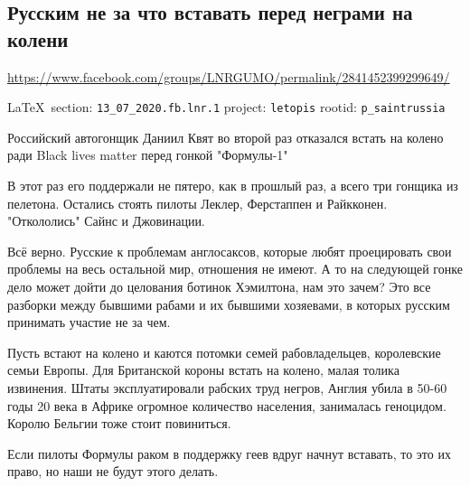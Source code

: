  
 

\subsection{Русским не за что вставать перед неграми на колени}
\url{https://www.facebook.com/groups/LNRGUMO/permalink/2841452399299649/}

\vspace{0.5cm}
{\ifDEBUG\small\LaTeX~section: \verb|13_07_2020.fb.lnr.1| project: \verb|letopis| rootid: \verb|p_saintrussia|\fi}
\vspace{0.5cm}

  
Российский автогонщик Даниил Квят во второй раз отказался встать на колено ради
Black lives matter перед гонкой "Формулы-1"

В этот раз его поддержали не пятеро, как в прошлый раз, а всего три гонщика из
пелетона. Остались стоять пилоты Леклер, Ферстаппен и Райкконен. "Откололись"
Сайнс и Джовинации.

Всё верно. Русские к проблемам англосаксов, которые любят проецировать свои
проблемы на весь остальной мир, отношения не имеют. А то на следующей гонке
дело может дойти до целования ботинок Хэмилтона, нам это зачем? Это все
разборки между бывшими рабами и их бывшими хозяевами, в которых русским
принимать участие не за чем.

Пусть встают на колено и каются потомки семей рабовладельцев, королевские семьи
Европы. Для Британской короны встать на колено, малая толика извинения. Штаты
эксплуатировали рабских труд негров, Англия убила в 50-60 годы 20 века в Африке
огромное количество населения, занималась геноцидом. Королю Бельгии тоже стоит
повиниться.

Если пилоты Формулы раком в поддержку геев вдруг начнут вставать, то это их
право, но наши не будут этого делать.
